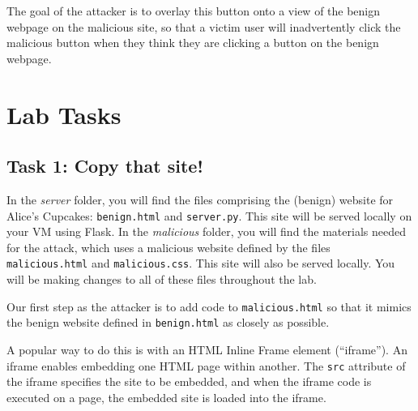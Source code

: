 The goal of the attacker is to overlay this button onto a view of the
benign webpage on the malicious site, so that a victim user will
inadvertently click the malicious button when they think they are
clicking a button on the benign webpage.


\section{Lab Tasks} 


\subsection{Task 1: Copy that site!}

In the \textit{server} folder, you will find the files comprising the
(benign) website for Alice's Cupcakes: \texttt{benign.html} and
\texttt{server.py}. This site will be served locally on your VM using
Flask. In the \textit{malicious} folder, you will find the materials
needed for the attack, which uses a malicious website defined by the
files \texttt{malicious.html} and \texttt{malicious.css}. This site will
also be served locally. You will be making changes to all of these files
throughout the lab. 

Our first step as the attacker is to add code to \texttt{malicious.html}
so that it mimics the benign website defined in \texttt{benign.html} as
closely as possible.

\noindent A popular way to do this is with an HTML Inline Frame element
(``iframe''). An iframe enables embedding one HTML page within another.
The \texttt{src} attribute of the iframe specifies the site to be
embedded, and when the iframe code is executed on a page, the embedded
site is loaded into the iframe. 

